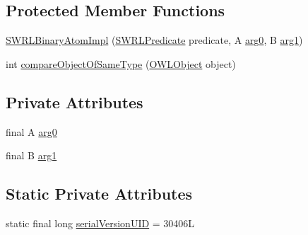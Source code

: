 \subsection*{Protected Member Functions}
\begin{DoxyCompactItemize}
\item 
\hyperlink{classuk_1_1ac_1_1manchester_1_1cs_1_1owl_1_1owlapi_1_1_s_w_r_l_binary_atom_impl_3_01_a_01extends733cb0b232fc39d6f31ee5b88a06cbcc_a3ec0fa86316447d0763a600c83ccab03}{S\-W\-R\-L\-Binary\-Atom\-Impl} (\hyperlink{interfaceorg_1_1semanticweb_1_1owlapi_1_1model_1_1_s_w_r_l_predicate}{S\-W\-R\-L\-Predicate} predicate, A \hyperlink{classuk_1_1ac_1_1manchester_1_1cs_1_1owl_1_1owlapi_1_1_s_w_r_l_binary_atom_impl_3_01_a_01extends733cb0b232fc39d6f31ee5b88a06cbcc_a69c1f1d1d275bd71590c783697044f54}{arg0}, B \hyperlink{classuk_1_1ac_1_1manchester_1_1cs_1_1owl_1_1owlapi_1_1_s_w_r_l_binary_atom_impl_3_01_a_01extends733cb0b232fc39d6f31ee5b88a06cbcc_a7477a964edfae3509b50869ce26ceaaf}{arg1})
\item 
int \hyperlink{classuk_1_1ac_1_1manchester_1_1cs_1_1owl_1_1owlapi_1_1_s_w_r_l_binary_atom_impl_3_01_a_01extends733cb0b232fc39d6f31ee5b88a06cbcc_aa4b0c4fa00e5ae013719740bbca9be12}{compare\-Object\-Of\-Same\-Type} (\hyperlink{interfaceorg_1_1semanticweb_1_1owlapi_1_1model_1_1_o_w_l_object}{O\-W\-L\-Object} object)
\end{DoxyCompactItemize}
\subsection*{Private Attributes}
\begin{DoxyCompactItemize}
\item 
final A \hyperlink{classuk_1_1ac_1_1manchester_1_1cs_1_1owl_1_1owlapi_1_1_s_w_r_l_binary_atom_impl_3_01_a_01extends733cb0b232fc39d6f31ee5b88a06cbcc_a69c1f1d1d275bd71590c783697044f54}{arg0}
\item 
final B \hyperlink{classuk_1_1ac_1_1manchester_1_1cs_1_1owl_1_1owlapi_1_1_s_w_r_l_binary_atom_impl_3_01_a_01extends733cb0b232fc39d6f31ee5b88a06cbcc_a7477a964edfae3509b50869ce26ceaaf}{arg1}
\end{DoxyCompactItemize}
\subsection*{Static Private Attributes}
\begin{DoxyCompactItemize}
\item 
static final long \hyperlink{classuk_1_1ac_1_1manchester_1_1cs_1_1owl_1_1owlapi_1_1_s_w_r_l_binary_atom_impl_3_01_a_01extends733cb0b232fc39d6f31ee5b88a06cbcc_a23cca0947156b637c169600485f4212d}{serial\-Version\-U\-I\-D} = 30406\-L
\end{DoxyCompactItemize}
